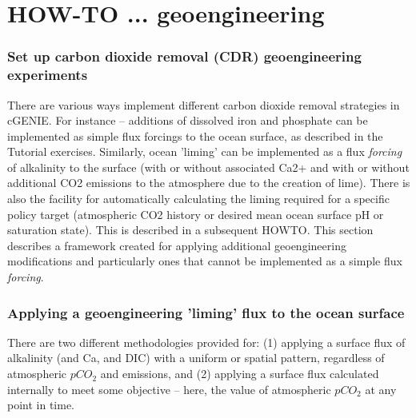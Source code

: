 \documentclass[11pt,fleqn]{book} %
\begin{document}

\newpage


\section{HOW-TO ... geoengineering}

\subsubsection{Set up carbon dioxide removal (CDR) geoengineering experiments}

There are various ways implement different carbon dioxide removal strategies in cGENIE. For instance -- additions of dissolved iron and phosphate can be implemented as simple flux forcings to the ocean surface, as described in the Tutorial exercises. Similarly, ocean 'liming'
 can be implemented as a flux \textit{forcing} of alkalinity to the surface (with or without associated Ca2+ and with or without additional CO2 emissions to the atmosphere due to the creation of lime).
There is also the facility for automatically calculating the liming required for a specific policy target (atmospheric CO2 history or desired mean ocean surface pH or saturation state). This is described in a subsequent HOWTO.
This section describes a framework created for applying additional geoengineering modifications and particularly ones that cannot be implemented as a simple flux \textit{forcing}.

%
\subsubsection{Applying a geoengineering 'liming' flux to the ocean surface}
\vspace{1mm}

There are two different methodologies provided for: (1) applying a surface flux of alkalinity (and Ca, and DIC) with a uniform or spatial pattern, regardless of atmospheric \(pCO_{2}\) and emissions, and (2) applying a surface flux calculated internally to meet some objective -- here, the value of atmospheric \(pCO_{2}\) at any point in time.
\end{document}
